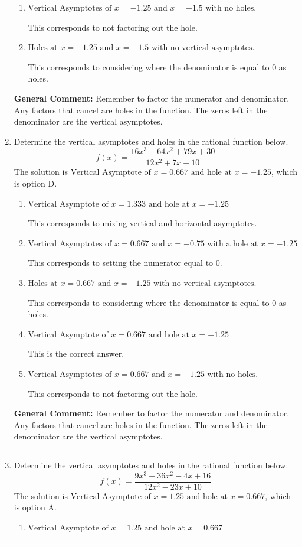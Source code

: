 \documentclass{extbook}[14pt]
\newcommand{\litem}[1]{\item #1

\rule{\textwidth}{0.4pt}}
\begin{document}
\begin{enumerate}
{\begin{enumerate}[label=\Alph*.]
This corresponds to mixing vertical and horizontal asymptotes.
\item \( \text{Vertical Asymptotes of } x = -1.25 \text{ and } x = -1.5 \text{ with no holes.} \)

This corresponds to not factoring out the hole.
\item \( \text{Holes at } x = -1.25 \text{ and } x = -1.5 \text{ with no vertical asymptotes.} \)

This corresponds to considering where the denominator is equal to 0 as holes.
\end{enumerate}

\textbf{General Comment:} Remember to factor the numerator and denominator. Any factors that cancel are holes in the function. The zeros left in the denominator are the vertical asymptotes.
}
\litem{
Determine the vertical asymptotes and holes in the rational function below.
\[ f(x) = \frac{16x^{3} +64 x^{2} +79 x + 30}{12x^{2} +7 x -10} \]The solution is \( \text{Vertical Asymptote of } x = 0.667 \text{ and hole at } x = -1.25 \), which is option D.\begin{enumerate}[label=\Alph*.]
\item \( \text{Vertical Asymptote of } x = 1.333 \text{ and hole at } x = -1.25 \)

This corresponds to mixing vertical and horizontal asymptotes.
\item \( \text{Vertical Asymptotes of } x = 0.667 \text{ and } x = -0.75 \text{ with a hole at } x = -1.25 \)

This corresponds to setting the numerator equal to 0.
\item \( \text{Holes at } x = 0.667 \text{ and } x = -1.25 \text{ with no vertical asymptotes.} \)

This corresponds to considering where the denominator is equal to 0 as holes.
\item \( \text{Vertical Asymptote of } x = 0.667 \text{ and hole at } x = -1.25 \)

This is the correct answer.
\item \( \text{Vertical Asymptotes of } x = 0.667 \text{ and } x = -1.25 \text{ with no holes.} \)

This corresponds to not factoring out the hole.
\end{enumerate}

\textbf{General Comment:} Remember to factor the numerator and denominator. Any factors that cancel are holes in the function. The zeros left in the denominator are the vertical asymptotes.
}
\litem{
Determine the vertical asymptotes and holes in the rational function below.
\[ f(x) = \frac{9x^{3} -36 x^{2} -4 x + 16}{12x^{2} -23 x + 10} \]The solution is \( \text{Vertical Asymptote of } x = 1.25 \text{ and hole at } x = 0.667 \), which is option A.\begin{enumerate}[label=\Alph*.]
\item \( \text{Vertical Asymptote of } x = 1.25 \text{ and hole at } x = 0.667 \)


\end{enumerate}}
\end{enumerate}
\end{document}
